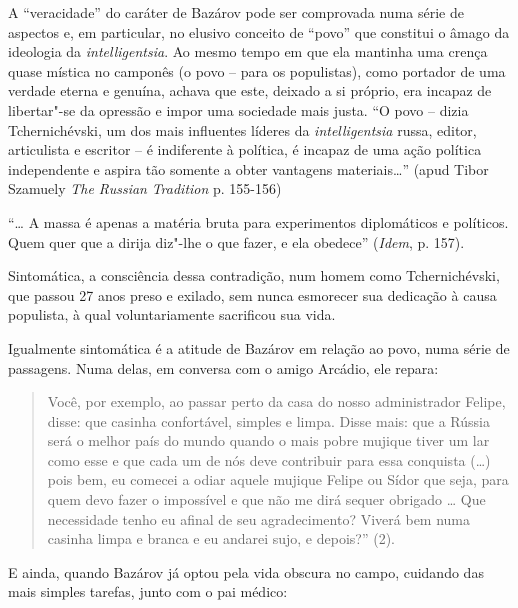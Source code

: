 A ``veracidade'' do caráter de Bazárov pode ser comprovada numa série de
aspectos e, em particular, no elusivo conceito de ``povo'' que constitui
o âmago da ideologia da \emph{intelligentsia}. Ao mesmo tempo em que ela
mantinha uma crença quase mística no camponês (o povo -- para os
populistas), como portador de uma verdade eterna e genuína, achava que
este, deixado a si próprio, era incapaz de libertar"-se da opressão e
impor uma sociedade mais justa. ``O povo -- dizia Tchernichévski, um dos
mais influentes líderes da \emph{intelligentsia} russa, editor,
articulista e escritor -- é indiferente à política, é incapaz de uma
ação política independente e aspira tão somente a obter vantagens
materiais\ldots{}'' (apud Tibor Szamuely \emph{The Russian} { }
\emph{Tradition} p. 155-156)

``\ldots{} A massa é apenas a matéria bruta para experimentos diplomáticos e
políticos. Quem quer que a dirija diz"-lhe o que fazer, e ela obedece''
(\emph{Idem}, p. 157).

Sintomática, a consciência dessa contradição, num homem como
Tchernichévski, que passou 27 anos preso e exilado, sem nunca esmorecer
sua dedicação à causa populista, à qual voluntariamente sacrificou sua
vida.

Igualmente sintomática é a atitude de Bazárov em relação ao povo, numa
série de passagens. Numa delas, em conversa com o amigo Arcádio, ele
repara:

\begin{quote}
Você, por exemplo, ao passar perto da casa do nosso administrador
Felipe, disse: que casinha confortável, simples e limpa. Disse mais: que
a Rússia será o melhor país do mundo quando o mais pobre mujique tiver
um lar como esse e que cada um de nós deve contribuir para essa
conquista (\ldots{}) pois bem, eu comecei a odiar aquele mujique Felipe ou
Sídor que seja, para quem devo fazer o impossível e que não me dirá
sequer obrigado \ldots{} Que necessidade tenho eu afinal de seu
agradecimento? Viverá bem numa casinha limpa e branca e eu andarei sujo,
e depois?'' (2).
\end{quote}

E ainda, quando Bazárov já optou pela vida obscura no campo, cuidando
das mais simples tarefas, junto com o pai médico:

